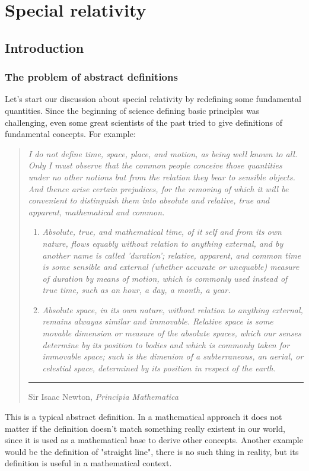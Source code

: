 \part{Special relativity}
\chapter{Introduction}
\section{The problem of abstract definitions}
Let's start our discussion about special relativity by redefining some fundamental quantities. Since the beginning of science defining basic principles was challenging, even some great scientists of the past tried to give definitions of fundamental concepts. For example:
\begin{quotation}
  \noindent\textit{I do not define time, space, place, and motion, as being well known to all. Only I must observe that the common people conceive those quantities under no other notions but from the relation they bear to sensible objects. And thence arise certain prejudices, for the removing of which it will be convenient to distinguish them into absolute and relative, true and apparent, mathematical and common.}
  \begin{enumerate}
    \item \textit{Absolute, true, and mathematical time, of it self and from its own nature, flows equably without relation to anything external, and by another name is called 'duration'; relative, apparent, and common time is some sensible and external (whether accurate or unequable) measure of duration by means of motion, which is commonly used instead of true time, such as an hour, a day, a month, a year.}
    \item \textit{Absolute space, in its own nature, without relation to anything external, remains alwayas similar and immovable. Relative space is some movable dimension or measure of the absolute spaces, which our senses determine by its position to bodies and which is commonly taken for immovable space; such is the dimenion of a subterraneous, an aerial, or celestial space, determined by its position in respect of the earth.}
  \end{enumerate}
  \noindent\rule{\linewidth}{0.4pt}

  \hfill Sir Isaac Newton, \textit{Principia Mathematica}
\end{quotation}
This is a typical abstract definition. In a mathematical approach it does not matter if the definition doesn't match something really existent in our world, since it is used as a mathematical base to derive other concepts. Another example would be the definition of "straight line", there is no such thing in reality, but its definition is useful in a mathematical context.\\
